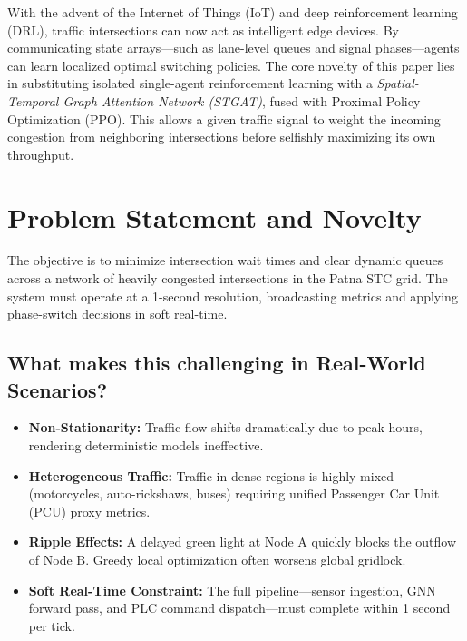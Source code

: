 \documentclass[12pt, onecolumn]{IEEEtran}
\begin{document}
With the advent of the Internet of Things (IoT) and deep reinforcement learning (DRL), traffic intersections can now act as intelligent edge devices. By communicating state arrays---such as lane-level queues and signal phases---agents can learn localized optimal switching policies. The core novelty of this paper lies in substituting isolated single-agent reinforcement learning with a \textit{Spatial-Temporal Graph Attention Network (STGAT)}, fused with Proximal Policy Optimization (PPO). This allows a given traffic signal to weight the incoming congestion from neighboring intersections before selfishly maximizing its own throughput. 

\section{Problem Statement and Novelty}
The objective is to minimize intersection wait times and clear dynamic queues across a network of heavily congested intersections in the Patna STC grid. The system must operate at a 1-second resolution, broadcasting metrics and applying phase-switch decisions in soft real-time.

\subsection{What makes this challenging in Real-World Scenarios?}
\begin{itemize}
    \item \textbf{Non-Stationarity:} Traffic flow shifts dramatically due to peak hours, rendering deterministic models ineffective.
    \item \textbf{Heterogeneous Traffic:} Traffic in dense regions is highly mixed (motorcycles, auto-rickshaws, buses) requiring unified Passenger Car Unit (PCU) proxy metrics.
    \item \textbf{Ripple Effects:} A delayed green light at Node A quickly blocks the outflow of Node B. Greedy local optimization often worsens global gridlock.
    \item \textbf{Soft Real-Time Constraint:} The full pipeline---sensor ingestion, GNN forward pass, and PLC command dispatch---must complete within 1 second per tick.
\end{itemize}
\end{document}
